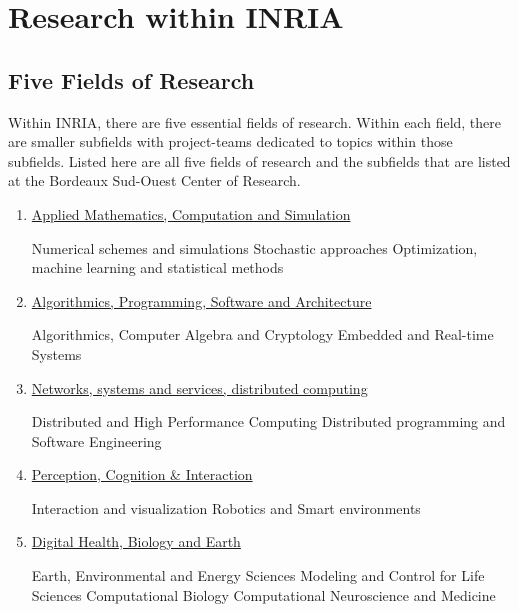 
\newpage
\section{Research within INRIA}

\subsection{Five Fields of Research}

Within INRIA, there are five essential fields of research. Within each field, there are smaller subfields with project-teams dedicated to topics within those subfields. Listed here are all five fields of research and the subfields that are listed at the Bordeaux Sud-Ouest Center of Research.
\begin{enumerate}

\item \href{http://www.inria.fr/en/research/research-fields/five-fields-of-research/applied-mathematics-computation-and-simulation}{Applied Mathematics, Computation and Simulation}

\subitem Numerical schemes and simulations
\subitem Stochastic approaches
\subitem Optimization, machine learning and statistical methods

\item \href{http://www.inria.fr/en/research/research-fields/five-fields-of-research/algorithmics-programming-software-and-architecture}{Algorithmics, Programming, Software and Architecture}

\subitem Algorithmics, Computer Algebra and Cryptology
\subitem Embedded and Real-time Systems

\item \href{http://www.inria.fr/en/research/research-fields/five-fields-of-research/networks-systems-and-services-distributed-computing}{Networks, systems and services, distributed computing}

\subitem Distributed and High Performance Computing
\subitem Distributed programming and Software Engineering

\item \href{http://www.inria.fr/en/research/research-fields/five-fields-of-research/perception-cognition-interaction}{Perception, Cognition \& Interaction}

\subitem Interaction and visualization
\subitem Robotics and Smart environments

\item \href{http://www.inria.fr/en/research/research-fields/five-fields-of-research/digital-health-biology-and-earth}{Digital Health, Biology and Earth}

\subitem Earth, Environmental and Energy Sciences
\subitem Modeling and Control for Life Sciences
\subitem Computational Biology
\subitem Computational Neuroscience and Medicine

\end{enumerate}


